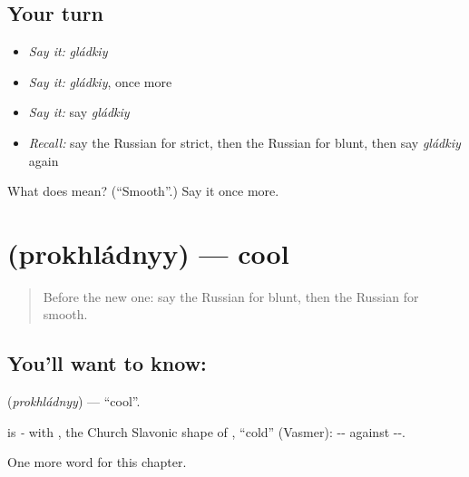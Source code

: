 \subsection*{Your turn}
\begin{itemize}
\raggedright
  \item \emph{Say it:} \emph{gládkiy}
  \item \emph{Say it:} \emph{gládkiy}, once more
  \item \emph{Say it:} say \emph{gládkiy}
  \item \emph{Recall:} say the Russian for strict, then the Russian for blunt, then say \emph{gládkiy} again
\end{itemize}

\begin{tcolorbox}[breakable,colback=teal!4,colframe=teal!35!black,title={Before you move on}]
What does  mean? (\textquotedblleft{}Smooth\textquotedblright{}.) Say it once more.
\end{tcolorbox}
\section[\texorpdfstring{\ru{прохладный} (prokhládnyy)}{прохладный (prokhládnyy)}]{ (prokhládnyy) — cool}

\label{lesson:RU-C217-prokhladnyy}



\begin{quote}
Before the new one: say the Russian for blunt, then the Russian for smooth.
\end{quote}

\subsection*{You'll want to know: }
\textbf{} (\emph{prokhládnyy}) — \textquotedblleft{}cool\textquotedblright{}.

\begin{cousinweb}
\textbf{} is \emph{-} with \emph{}, the Church Slavonic shape of \emph{}, \textquotedblleft{}cold\textquotedblright{} (Vasmer): -- against --.
\end{cousinweb}

\begin{grammarlens}[title={What you've built}]
One more word for this chapter.
\end{grammarlens}

